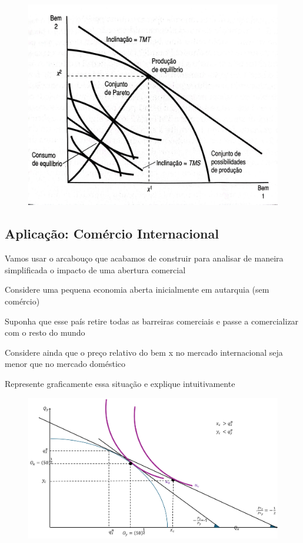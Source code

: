 \documentclass[a4paper,12pt]{article}[abntex2]
\begin{document}
\begin{figure}[H]
    \centering
    \includegraphics[width=0.70\linewidth]{Imagens/a3i7.png}
\end{figure}

\subsection{\textbf{Aplicação: Comércio Internacional}}

Vamos usar o arcabouço que acabamos de construir para analisar de maneira simplificada o impacto de uma abertura comercial

Considere uma pequena economia aberta inicialmente em autarquia (sem comércio)

Suponha que esse país retire todas as barreiras comerciais e passe a comercializar com o resto do mundo

Considere ainda que o preço relativo do bem x  no mercado internacional seja menor que no mercado doméstico

Represente graficamente essa situação e explique intuitivamente
\begin{figure}[H]
    \centering
    \includegraphics[width=0.7\linewidth]{Imagens/a6i2.png}
\end{figure}
\end{document}
